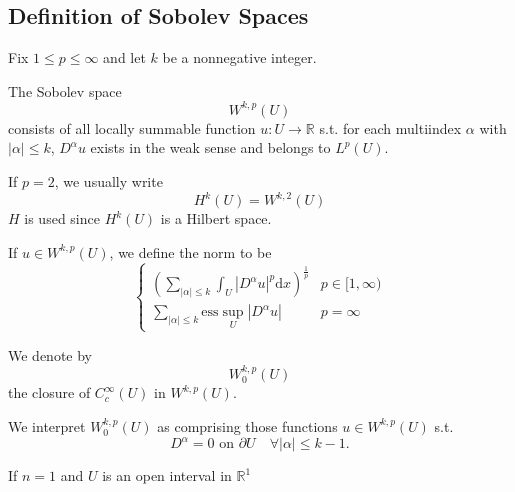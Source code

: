 \subsection{Definition of Sobolev Spaces}
Fix $1\le p\le \infty$ and let $k$ be a nonnegative integer. 
\begin{definition}
    The Sobolev space \[W^{k,p}(U)\] consists of all locally summable function $u:U\to\mathbb{R}$ s.t. for each multiindex $\alpha$ with $|\alpha|\le k$,
    $D^\alpha u$ exists in the weak sense and belongs to $L^p(U)$.
\end{definition}
\begin{notation}
    If $p=2$, we usually write \[H^k(U)=W^{k,2}(U)\] 
    $H$ is used since $H^k(U)$ is a Hilbert space.
\end{notation}

\begin{definition}
    If $u\in W^{k,p}(U)$, we define the norm to be 
    \begin{equation}
        \left\{\begin{matrix}
            (\sum_{|\alpha|\le k}\int_U |D^\alpha u|^p\mathrm{d}x)^{\frac{1}{p}}  & p\in [1,\infty)\\
             \sum_{|\alpha|\le k} \text{ess}\sup_U |D^\alpha u| & p=\infty
            \end{matrix}\right.            
    \end{equation}
\end{definition}

\begin{notation}
    
\end{notation}

\begin{notation}
    We denote by \[W_0^{k,p}(U)\] the closure of $C_c^\infty(U)$ in $W^{k,p}(U)$.
\end{notation}
We interpret $W_0^{k,p}(U)$ as comprising those functions $u\in W^{k,p}(U)$ s.t. 
\[D^\alpha=0\text{ on }\partial U\quad \forall |\alpha|\leq k-1. \]

\begin{example}
    If $n=1$ and $U$ is an open interval in $\mathbb{R}^1$
\end{example}

